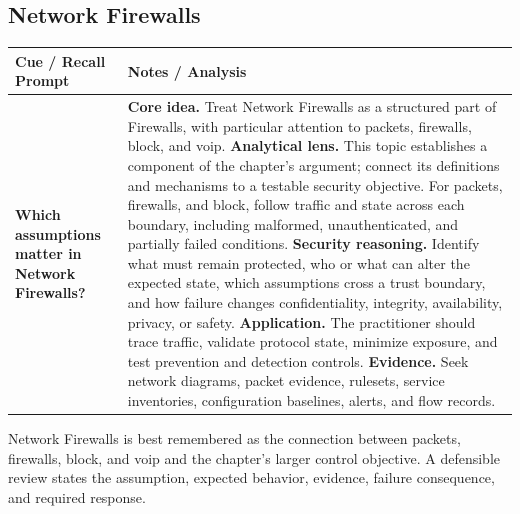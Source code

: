 \documentclass[11pt]{article}
\newcommand{\CornellHeader}{%
\rowcolor{Navy}\color{white}\bfseries Cue / Recall Prompt & \color{white}\bfseries Notes / Analysis\\\hline}
\newcommand{\CornellRow}[2]{%
\cellcolor{CueGray}\RaggedRight\textbf{#1} & \RaggedRight #2\\\hline}
\begin{document}
\subsection*{Network Firewalls}
\begin{longtable}{>{\RaggedRight\arraybackslash}p{}|>{\RaggedRight\arraybackslash}p{}}
\CornellHeader
\CornellRow{Which assumptions matter in Network Firewalls?}{\textbf{Core idea.} Treat Network Firewalls as a structured part of Firewalls, with particular attention to packets, firewalls, block, and voip. \textbf{Analytical lens.} This topic establishes a component of the chapter's argument; connect its definitions and mechanisms to a testable security objective. For packets, firewalls, and block, follow traffic and state across each boundary, including malformed, unauthenticated, and partially failed conditions. \textbf{Security reasoning.} Identify what must remain protected, who or what can alter the expected state, which assumptions cross a trust boundary, and how failure changes confidentiality, integrity, availability, privacy, or safety. \textbf{Application.} The practitioner should trace traffic, validate protocol state, minimize exposure, and test prevention and detection controls. \textbf{Evidence.} Seek network diagrams, packet evidence, rulesets, service inventories, configuration baselines, alerts, and flow records.}
\end{longtable}
\begin{topicsummary}
Network Firewalls is best remembered as the connection between packets, firewalls, block, and voip and the chapter's larger control objective. A defensible review states the assumption, expected behavior, evidence, failure consequence, and required response.
\end{topicsummary}
\end{document}
